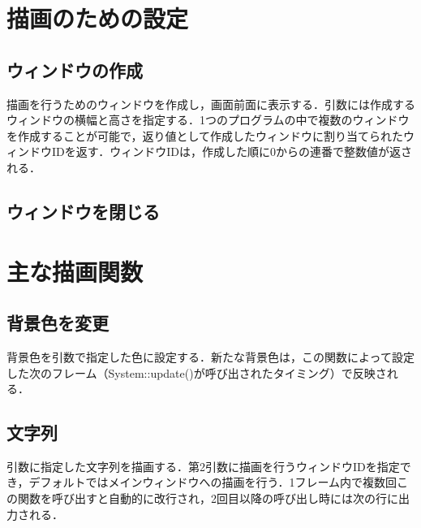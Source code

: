 \documentclass[a4paper, 11pt, oneside, onecolumn, openany]{jsarticle}
\begin{document}
\section{描画のための設定}
\subsection{ウィンドウの作成}
描画を行うためのウィンドウを作成し，画面前面に表示する．引数には作成するウィンドウの横幅と高さを指定する．1つのプログラムの中で複数のウィンドウを作成することが可能で，返り値として作成したウィンドウに割り当てられたウィンドウIDを返す．ウィンドウIDは，作成した順に0からの連番で整数値が返される．

\subsection{ウィンドウを閉じる}


\section{主な描画関数}
\subsection{背景色を変更}
背景色を引数で指定した色に設定する．新たな背景色は，この関数によって設定した次のフレーム（System::update()が呼び出されたタイミング）で反映される．

\subsection{文字列}
引数に指定した文字列を描画する．第2引数に描画を行うウィンドウIDを指定でき，デフォルトではメインウィンドウへの描画を行う．1フレーム内で複数回この関数を呼び出すと自動的に改行され，2回目以降の呼び出し時には次の行に出力される．
\end{document}
